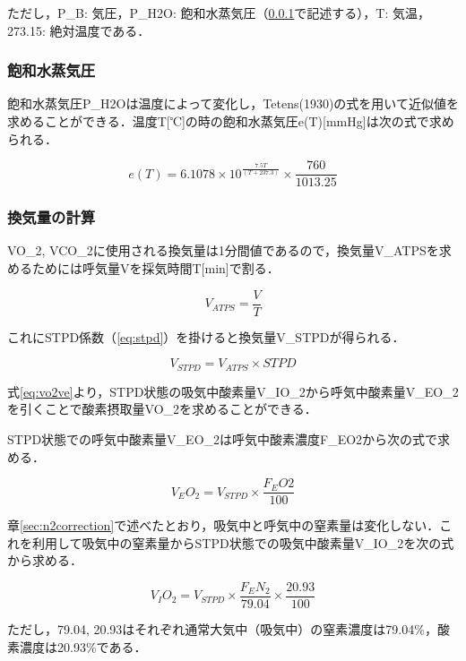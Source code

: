 ただし，P_B: 気圧，P_{H2O}: 飽和水蒸気圧（\ref{sec:swvp}で記述する），T: 気温，273.15: 絶対温度である．

\subsubsection{飽和水蒸気圧}
\label{sec:swvp}

飽和水蒸気圧P_{H2O}は温度によって変化し，Tetens(1930)の式を用いて近似値を求めることができる．温度T[℃]の時の飽和水蒸気圧e(T)[mmHg]は次の式で求められる．

\begin{equation}
  e(T) = 6.1078 \times 10 ^ \frac{7.5T}{(T + 237.3)} \times \frac{760}{1013.25}
\end{equation}

\subsubsection{換気量の計算}

VO_2, VCO_2に使用される換気量は1分間値であるので，換気量V_{ATPS}を求めるためには呼気量Vを採気時間T[min]で割る．

\begin{equation}
  V_{ATPS} = \frac{V}{T}
\end{equation}

これにSTPD係数（\ref{eq:stpd}）を掛けると換気量V_{STPD}が得られる．

\begin{equation}
  V_{STPD} = V_{ATPS} \times STPD
\end{equation}

式\ref{eq:vo2ve}より，STPD状態の吸気中酸素量V_IO_2から呼気中酸素量V_EO_2を引くことで酸素摂取量VO_2を求めることができる．

STPD状態での呼気中酸素量V_EO_2は呼気中酸素濃度F_EO2から次の式で求める．

\begin{equation}
  V_EO_2 = V_{STPD} \times \frac{F_EO2}{100}
\end{equation}

章\ref{sec:n2correction}で述べたとおり，吸気中と呼気中の窒素量は変化しない．これを利用して吸気中の窒素量からSTPD状態での吸気中酸素量V_IO_2を次の式から求める．

\begin{equation}
  V_IO_2 = V_{STPD} \times \frac{F_EN_2}{79.04} \times \frac{20.93}{100}
\end{equation}

ただし，79.04, 20.93はそれぞれ通常大気中（吸気中）の窒素濃度は79.04\%，酸素濃度は20.93\%である．

